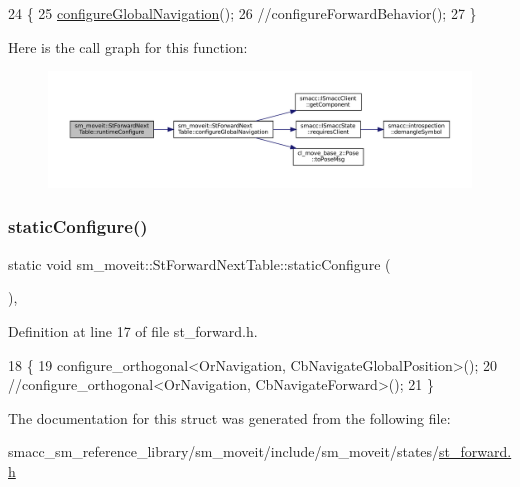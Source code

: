 \begin{DoxyCode}
24   \{
25     \hyperlink{structsm__moveit_1_1StForwardNextTable_ac3b63f25fad5cecd8faa51b427719d07}{configureGlobalNavigation}();
26     \textcolor{comment}{//configureForwardBehavior();}
27   \}
\end{DoxyCode}
Here is the call graph for this function\+:
\nopagebreak
\begin{figure}[H]
\begin{center}
\leavevmode
\includegraphics[width=350pt]{structsm__moveit_1_1StForwardNextTable_a4f6c466efdb91b0eb9aaee71f87a4fc4_cgraph}
\end{center}
\end{figure}
\mbox{\label{structsm__moveit_1_1StForwardNextTable_a2f28979d2a049e53b91802421771bcfb}} 
\subsubsection{\texorpdfstring{static\+Configure()}{staticConfigure()}}
{\footnotesize\ttfamily static void sm\+\_\+moveit\+::\+St\+Forward\+Next\+Table\+::static\+Configure (\begin{DoxyParamCaption}{ }\end{DoxyParamCaption})\hspace{0.3cm}{\ttfamily [inline]}, {\ttfamily [static]}}



Definition at line 17 of file st\+\_\+forward.\+h.


\begin{DoxyCode}
18   \{
19      configure\_orthogonal<OrNavigation, CbNavigateGlobalPosition>();
20     \textcolor{comment}{//configure\_orthogonal<OrNavigation, CbNavigateForward>();}
21   \}
\end{DoxyCode}


The documentation for this struct was generated from the following file\+:\begin{DoxyCompactItemize}
\item 
smacc\+\_\+sm\+\_\+reference\+\_\+library/sm\+\_\+moveit/include/sm\+\_\+moveit/states/\hyperlink{include_2sm__moveit_2states_2st__forward_8h}{st\+\_\+forward.\+h}\end{DoxyCompactItemize}
